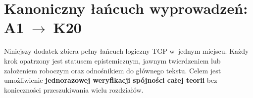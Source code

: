 %
%
%
%

\section{Kanoniczny \l{}a\'ncuch wyprowadze\'n: A1\texorpdfstring{$\;\to\;$}{→}K20}%
\label{app:lancuch}

Niniejszy dodatek zbiera pe\l{}ny \l{}a\'ncuch logiczny TGP w~jednym
miejscu. Ka\.zdy krok opatrzony jest statusem epistemicznym, jawnym
twierdzeniem lub za\l{}o\.zeniem roboczym oraz odno\'snikiem do
g\l{}\'ownego tekstu. Celem jest umo\.zliwienie \textbf{jednorazowej
weryfikacji sp\'ojno\'sci ca\l{}ej teorii} bez konieczno\'sci
przeszukiwania wielu rozdzia\l{\'ow}.

\medskip
\noindent{}
\medskip

